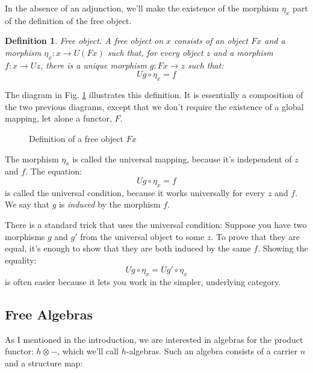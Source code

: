 \documentclass[letterpaper, 10 pt, conference]{ieeeconf}
\newtheorem{definition}{Definition}[section]
\begin{document}
In the absence of an adjunction, we'll make the existence of the morphism $\eta_x$ part of the definition of the free object.

\begin{definition}{Free object.}
A free object on $x$ consists of an object $F x$ and a morphism $\eta_x \colon x \to U (F x)$ such that, for every object $z$ and a morphism $f \colon x \to U z$, there is a unique morphism $g \colon F x \to z$ such that:
\[U g \circ \eta_x = f \]
\end{definition}

The diagram in Fig. \ref{fig-freeobj} illustrates this definition. It is essentially a composition of the two previous diagrams, except that we don't require the existence of a global mapping, let alone a functor, $F$.

\begin{figure}[h]
\centering
{}
\caption{Definition of a free object $F x$}
\label{fig-freeobj}
\end{figure}

The morphism $\eta_x$ is called the universal mapping, because it's independent of $z$ and $f$. The equation:
\[U g \circ \eta_x = f \]
is called the universal condition, because it works universally for every $z$ and $f$. We say that $g$ is \textit{induced} by the morphism $f$.

There is a standard trick that uses the universal condition: Suppose you have two morphisms $g$ and $g'$ from the universal object to some $z$. To prove that they are equal, it's enough to show that they are both induced by the same $f$. Showing the equality:
\[U g \circ \eta_x = U g' \circ \eta_x\]
is often easier because it lets you work in the simpler, underlying category.

\subsection{Free Algebras}

As I mentioned in the introduction, we are interested in algebras for the product functor: $h \otimes -$, which we'll call $h$-algebras. Such an algebra consists of a carrier $n$ and a structure map:
\end{document}
